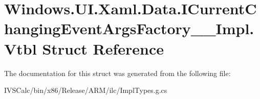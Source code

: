 \hypertarget{struct_windows_1_1_u_i_1_1_xaml_1_1_data_1_1_i_current_changing_event_args_factory_____impl_1_1_vtbl}{}\section{Windows.\+U\+I.\+Xaml.\+Data.\+I\+Current\+Changing\+Event\+Args\+Factory\+\_\+\+\_\+\+Impl.\+Vtbl Struct Reference}
\label{struct_windows_1_1_u_i_1_1_xaml_1_1_data_1_1_i_current_changing_event_args_factory_____impl_1_1_vtbl}


The documentation for this struct was generated from the following file\+:\begin{DoxyCompactItemize}
\item 
I\+V\+S\+Calc/bin/x86/\+Release/\+A\+R\+M/ilc/Impl\+Types.\+g.\+cs\end{DoxyCompactItemize}
